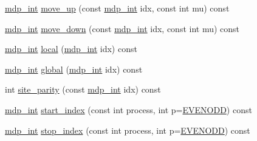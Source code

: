 \begin{DoxyCompactItemize}
\hyperlink{mdp__global__vars_8h_aaa1ad9d0dcd2124aa5af0120d9954174}{mdp\+\_\+int} \hyperlink{classmdp__lattice_a24238ce792de8d69096d6656da727b3f}{move\+\_\+up} (const \hyperlink{mdp__global__vars_8h_aaa1ad9d0dcd2124aa5af0120d9954174}{mdp\+\_\+int} idx, const int mu) const
\item 
\hyperlink{mdp__global__vars_8h_aaa1ad9d0dcd2124aa5af0120d9954174}{mdp\+\_\+int} \hyperlink{classmdp__lattice_a7e1ef9c265d9452088a9024fe44ddb5d}{move\+\_\+down} (const \hyperlink{mdp__global__vars_8h_aaa1ad9d0dcd2124aa5af0120d9954174}{mdp\+\_\+int} idx, const int mu) const
\item 
\hyperlink{mdp__global__vars_8h_aaa1ad9d0dcd2124aa5af0120d9954174}{mdp\+\_\+int} \hyperlink{classmdp__lattice_a90cb5cd77128959af52a2efa9ad206f1}{local} (\hyperlink{mdp__global__vars_8h_aaa1ad9d0dcd2124aa5af0120d9954174}{mdp\+\_\+int} idx) const
\item 
\hyperlink{mdp__global__vars_8h_aaa1ad9d0dcd2124aa5af0120d9954174}{mdp\+\_\+int} \hyperlink{classmdp__lattice_a23407af46f9715886fd574f06cd4a05e}{global} (\hyperlink{mdp__global__vars_8h_aaa1ad9d0dcd2124aa5af0120d9954174}{mdp\+\_\+int} idx) const
\item 
int \hyperlink{classmdp__lattice_ac2d4436f300d5528e2c25bf5493df0a7}{site\+\_\+parity} (const \hyperlink{mdp__global__vars_8h_aaa1ad9d0dcd2124aa5af0120d9954174}{mdp\+\_\+int} idx) const
\item 
\hyperlink{mdp__global__vars_8h_aaa1ad9d0dcd2124aa5af0120d9954174}{mdp\+\_\+int} \hyperlink{classmdp__lattice_a30b31dd7d1aec73bd90c24c81612e030}{start\+\_\+index} (const int process, int p=\hyperlink{mdp__global__vars_8h_a4c9de81f2de5a74b588107b6c0afb9ee}{E\+V\+E\+N\+O\+DD}) const
\item 
\hyperlink{mdp__global__vars_8h_aaa1ad9d0dcd2124aa5af0120d9954174}{mdp\+\_\+int} \hyperlink{classmdp__lattice_ac98aa2e5b78ce3b478935e0e8e0e808a}{stop\+\_\+index} (const int process, int p=\hyperlink{mdp__global__vars_8h_a4c9de81f2de5a74b588107b6c0afb9ee}{E\+V\+E\+N\+O\+DD}) const
\end{DoxyCompactItemize}
